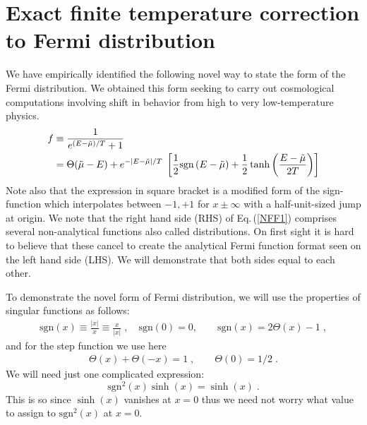 \documentclass[sn-mathphys,Numbered]{sn-jnl}
\theoremstyle{thmstyleone}%
\theoremstyle{thmstyletwo}%
\theoremstyle{thmstylethree}%
\begin{document}
\section{Exact finite temperature correction to Fermi distribution}\label{NewFermi}

We have empirically identified the following novel way to state the form of the Fermi distribution. We obtained this form seeking to carry out cosmological computations involving shift in behavior from high to very low-temperature physics. 
\begin{align}\label{NFF1}
f&\equiv \frac{1}{e^{ (E-\tilde\mu)/T} +1}\notag\\
&=\Theta(\tilde\mu - E) +  e^{ - |E-\tilde\mu|/T }
\; \left[\frac{1}{2}\mathrm{sgn}\left({E-\tilde\mu}\right) 
 +\frac{1}{2}\tanh\left(\frac{E-\tilde\mu}{2T}\right)\right]
\end{align}
Note also that the expression in square bracket is a modified form of the sign-function which interpolates between $-1,+1$ for $x\pm \infty$ with a half-unit-sized jump at origin.  We note  that the right hand side (RHS) of Eq.\,(\ref{NFF1}) comprises several non-analytical functions also called distributions. On first sight it is hard to believe that  these   cancel to create the analytical Fermi function format seen on the left hand side (LHS). We will demonstrate that both sides equal to each other.



To demonstrate the novel form of Fermi distribution, we will use the properties of singular functions as follows: 
\begin{align}\label{NFF2a}
\mathrm{sgn}(x)%
\equiv  \frac{|x|}{x}\equiv \frac{x}{|x|}\;,
   \quad \mathrm{sgn}(0)=0,\qquad
 \mathrm{sgn}(x)=2\Theta(x)-1\;,
 \end{align}
 and for the step function we use here
 \begin{align}
\label{NFF2c}
 \Theta(x)+\Theta(-x)=1\;,\qquad\label{NFF3}
 \Theta(0)=1/2\;.
 \end{align}
We will need just one complicated expression:
\begin{equation}\label{NFFa1}
\mathrm{sgn}^{2}(x)\sinh(x)=\sinh(x)\;.
 \end{equation}
This is so since $\sinh(x)$  vanishes  at $x=0$ thus we need not worry what value to assign to $\mathrm{sgn}^{2}(x)$ at $x=0$.  
\end{document}
